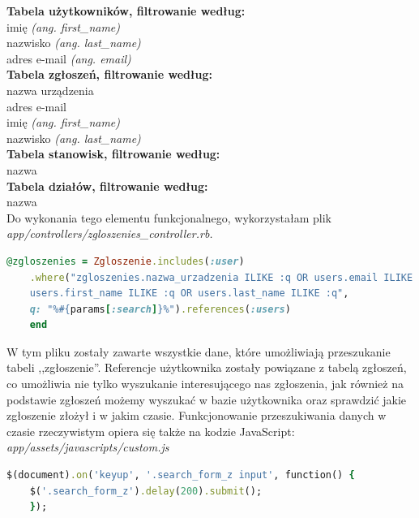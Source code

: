 \documentclass[openright]{xmgr}
\begin{document}
	\textbf{Tabela użytkowników, filtrowanie według:}\\
	\textendash\space imię \textit{(ang. first\_name)}\\
	\textendash\space nazwisko \textit{(ang. last\_name)}\\
	\textendash\space adres e-mail
	\textit{(ang. email)}\\
	
	\textbf{Tabela zgłoszeń, filtrowanie według:}\\
	\textendash\space nazwa urządzenia\\
	\textendash\space adres e-mail\\
	\textendash\space imię
	\textit{(ang. first\_name)}\\
	\textendash\space nazwisko
	\textit{(ang. last\_name)}\\
	
	\textbf{Tabela stanowisk, filtrowanie według:}\\
	\textendash\space nazwa\\
	
	\textbf{Tabela działów, filtrowanie według:}\\
	\textendash\space nazwa\\
	
	Do wykonania tego elementu funkcjonalnego, wykorzystałam plik\\
	\textit{app/controllers/zgloszenies\_controller.rb.}
	
	\begin{lstlisting}[language=Ruby,lineskip={-1pt},caption=Dane według których nastepuje przeszukiwanie]
	@zgloszenies = Zgloszenie.includes(:user)
	.where("zgloszenies.nazwa_urzadzenia ILIKE :q OR users.email ILIKE :q OR 
	users.first_name ILIKE :q OR users.last_name ILIKE :q", 
	q: "%#{params[:search]}%").references(:users)
	end
	\end{lstlisting}
	
	W tym pliku zostały zawarte wszystkie dane, które umożliwiają przeszukanie tabeli ,,zgłoszenie''. Referencje użytkownika zostały powiązane z tabelą zgłoszeń, co umożliwia nie tylko wyszukanie interesującego nas zgłoszenia, jak również na podstawie zgłoszeń możemy wyszukać w bazie użytkownika oraz sprawdzić jakie zgłoszenie złożył i w jakim czasie.
	Funkcjonowanie przeszukiwania danych w czasie rzeczywistym opiera się także na kodzie JavaScript:\\
	
	\textit{app/assets/javascripts/custom.js}
	\begin{lstlisting}[language=Ruby,lineskip={-1pt},caption=JavaScripts - przeszukiwanie w czasie rzeczywistym]
	$(document).on('keyup', '.search_form_z input', function() {
	$('.search_form_z').delay(200).submit();
	});
	\end{lstlisting}
	
\end{document}
